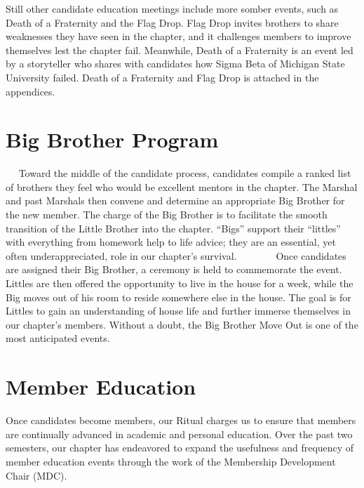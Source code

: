     Still other candidate education meetings include more somber events, such as Death of a Fraternity and the Flag Drop. Flag Drop invites brothers to share weaknesses they have seen in the chapter, and it challenges members to improve themselves lest the chapter fail. Meanwhile, Death of a Fraternity is an event led by a storyteller who shares with candidates how Sigma Beta of Michigan State University failed. Death of a Fraternity and Flag Drop is attached in the appendices.
  
  \section*{Big Brother Program}
  
    Toward the middle of the candidate process, candidates compile a ranked list of brothers they feel who would be excellent mentors in the chapter. The Marshal and past Marshals then convene and determine an appropriate Big Brother for the new member. The charge of the Big Brother is to facilitate the smooth transition of the Little Brother into the chapter. ``Bigs'' support their ``littles'' with everything from homework help to life advice; they are an essential, yet often underappreciated, role in our chapter’s survival. 
    
    Once candidates are assigned their Big Brother, a ceremony is held to commemorate the event. Littles are then offered the opportunity to live in the house for a week, while the Big moves out of his room to reside somewhere else in the house. The goal is for Littles to gain an understanding of house life and further immerse themselves in our chapter’s members. Without a doubt, the Big Brother Move Out is one of the most anticipated events. 
    
   \section*{Member Education}
      Once candidates become members, our Ritual charges us to ensure that members are continually advanced in academic and personal education. Over the past two semesters, our chapter has endeavored to expand the usefulness and frequency of member education events through the work of the Membership Development Chair (MDC). 
      
